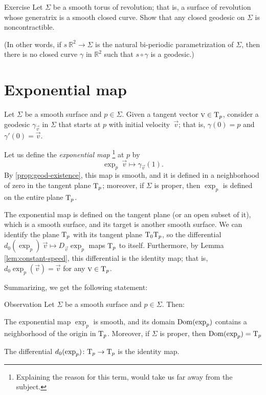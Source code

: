 \begin{thm}{Exercise}\label{ex:round-torus}
Let $\Sigma$ be a smooth torus of revolution; that is,
a surface of revolution whose generatrix is a smooth closed curve.
Show that any closed geodesic on $\Sigma$ is noncontractible.

(In other words, if $s\:\mathbb{R}^2\to \Sigma$ is the natural bi-periodic parametrization of $\Sigma$, then
there is no closed curve $\gamma$ in $\mathbb{R}^2$ such that $s\circ\gamma$ is a geodesic.)
\end{thm}


\section{Exponential map}\label{sec:exp}

Let $\Sigma$ be a smooth surface and $p\in \Sigma$.
Given a tangent vector ${\text{\sc{v}}}\in \mathrm{T}_p$, consider a geodesic $\gamma_{\vec v}$ in $\Sigma$ that starts at $p$ with initial velocity~$\vec v$; 
that is, $\gamma(0)=p$ and $\gamma'(0)={\vec v}$.

Let us define the \emph{exponential map}%
\footnote{Explaining the reason for this term, would take us far away from the subject.}
at $p$ by
\[\exp_p\:\vec v\mapsto \gamma_{\vec v}(1).\]
By \ref{prop:geod-existence}, this map is smooth, and it is defined in a neighborhood of zero in the tangent plane $\mathrm{T}_p$;
moreover, if $\Sigma$ is proper, 
then $\exp_p$ is defined on the entire plane $\mathrm{T}_p$.

The exponential map
is defined on the tangent plane (or an open subset of it), which is a smooth surface,
and its target is another smooth surface.
We can identify the plane $\mathrm{T}_p$
with its tangent plane $\mathrm{T}_0\mathrm{T}_p$, so the differential $d_0(\exp_p)\:\vec v\mapsto D_{\vec v}\exp_p$ maps $\mathrm{T}_p$ to itself.
Furthermore, by Lemma \ref{lem:constant-speed}, this differential is the identity map; that is, $d_0\exp_p(\vec v)=
\vec v$ for any $\text{\sc{v}}\in \mathrm{T}_p$.

Summarizing, we get the following statement:

\begin{thm}{Observation}\label{obs:d(exp)=1}
Let $\Sigma$ be a smooth surface and $p\in \Sigma$.
Then:

\begin{subthm}{}
The exponential map $\exp_p$ is smooth, and its domain $\mathop{\rm Dom}\nolimits(\exp_p)$ contains a neighborhood of the origin in $\mathrm{T}_p$.
Moreover, if $\Sigma$ is proper, then $\mathop{\rm Dom}\nolimits(\exp_p)=\mathrm{T}_p$
\end{subthm}

\begin{subthm}{}
The differential $d_0(\exp_p)\colon\mathrm{T}_p\to \mathrm{T}_p$ is the identity map.
\end{subthm}

\end{thm}

